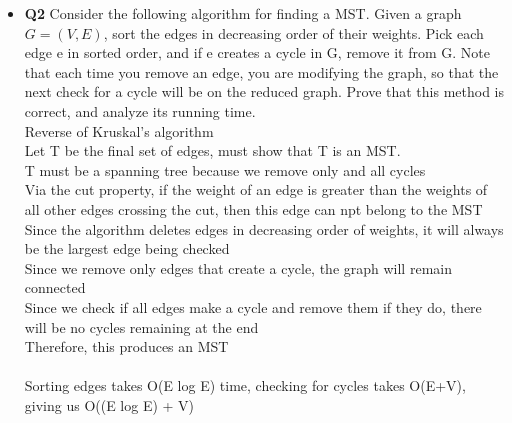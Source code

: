 \documentclass[11pt]{article}
\begin{document}
\begin{itemize}
\item \textbf{Q2} 
Consider the following algorithm for finding a MST. Given a graph $G=(V,E)$, sort the edges in decreasing order of their weights. Pick each edge e in sorted order, and if e creates a cycle in G, remove it from G. Note that each time you remove an edge, you are modifying the graph, so that the next check for a cycle will be on the reduced graph. Prove that this method is correct, and analyze its running time.
\\Reverse of Kruskal's algorithm
\\Let T be the final set of edges, must show that T is an MST.
\\T must be a spanning tree because we remove only and all cycles
\\Via the cut property, if the weight of an edge is greater than the weights of all other edges crossing the cut, then this edge can npt belong to the MST
\\Since the algorithm deletes edges in decreasing order of weights, it will always be the largest edge being checked
\\Since we remove only edges that create a cycle, the graph will remain connected
\\Since we check if all edges make a cycle and remove them if they do, there will be no cycles remaining at the end
\\Therefore, this produces an MST
\\
\\Sorting edges takes O(E log E) time, checking for cycles takes O(E+V), giving us O((E log E) + V)

\vspace{0.1in}


\end{itemize}
\end{document}
